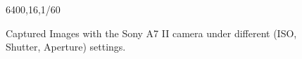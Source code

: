 \begin{figure}[t!]
{\begin{minipage}[t]{0.32\textwidth}
{\footnotesize 6400,16,1/60}
\end{minipage}
}\vspace{-3mm}
    \caption{Captured Images with the Sony A7 II camera under different (ISO, Shutter, Aperture) settings.}
    \label{fig6-1}
\end{figure}


\begin{figure}[t!]
    \centering
{}
\end{figure}
